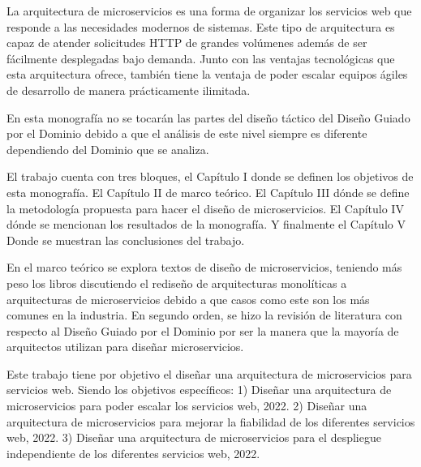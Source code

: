 
La arquitectura de microservicios es una forma de organizar los servicios web que responde a las
necesidades modernos de sistemas.
Este tipo de arquitectura es capaz de atender solicitudes HTTP de grandes volúmenes además de ser
fácilmente desplegadas bajo demanda.
Junto con las ventajas tecnológicas que esta arquitectura ofrece, también tiene la ventaja de poder
escalar equipos ágiles de desarrollo de manera prácticamente ilimitada.

En esta monografía no se tocarán las partes del diseño táctico del Diseño Guiado por el Dominio debido a
que el análisis de este nivel siempre es diferente dependiendo del Dominio que se analiza.

El trabajo cuenta con tres bloques, el Capítulo I donde se definen los objetivos de esta monografía.
El Capítulo II de marco teórico.
El Capítulo III dónde se define la metodología propuesta para hacer el diseño de microservicios.
El Capítulo IV dónde se mencionan los resultados de la monografía.
Y finalmente el Capítulo V Donde se muestran las conclusiones del trabajo.

En el marco teórico se explora textos de diseño de microservicios, teniendo más peso
los libros discutiendo el rediseño de arquitecturas monolíticas a arquitecturas de microservicios
debido a que casos como este son los más comunes en la industria.
En segundo orden, se hizo la revisión de literatura con respecto al Diseño Guiado por el Dominio
por ser la manera que la mayoría de arquitectos utilizan para diseñar microservicios.

Este trabajo tiene por objetivo el
diseñar una arquitectura de microservicios para servicios web.
Siendo los objetivos específicos:
1) Diseñar una arquitectura de microservicios para poder escalar los servicios web, 2022.
2) Diseñar una arquitectura de microservicios para mejorar la fiabilidad de los diferentes servicios web, 2022.
3) Diseñar una arquitectura de microservicios para el despliegue independiente de los diferentes servicios web, 2022.


\newpage
